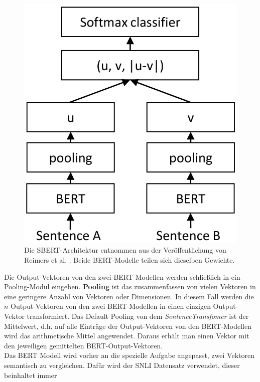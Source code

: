 \documentclass[12pt,letterpaper,ngerman]{article}
\begin{document}
\begin{figure}
  \begin{center}
    \includegraphics[scale=0.3]{abb/SBERT.png}
  \end{center}
  \caption{
    Die SBERT-Architektur entnommen aus der Veröffentlichung
    von Reimers et al.
    \cite{reimers-2019-sentence-bert}. 
    Beide BERT-Modelle teilen sich dieselben Gewichte. 
  }
\end{figure}
Die Output-Vektoren von den zwei BERT-Modellen werden schließlich 
in ein Pooling-Modul eingeben. 
{\bf Pooling} ist das zusammenfassen von vielen Vektoren 
in eine geringere Anzahl von Vektoren oder Dimensionen. In diesem 
Fall werden die $n$ Output-Vektoren von den zwei BERT-Modellen in
einen einzigen Output-Vektor transformiert. Das Default Pooling
von dem \textit{SentenceTransfomer} ist der Mittelwert, d.h.
auf alle  Einträge der Output-Vektoren von den BERT-Modellen
wird das arithmetische Mittel angewendet.
Daraus erhält man einen Vektor mit den jeweiligen gemittelten 
BERT-Output-Vektoren.\\
Das BERT Modell wird  vorher an die spezielle Aufgabe 
angepasst, zwei Vektoren semantisch zu vergleichen. 
Dafür wird der SNLI Datensatz verwendet, dieser beinhaltet immer 
\end{document}
